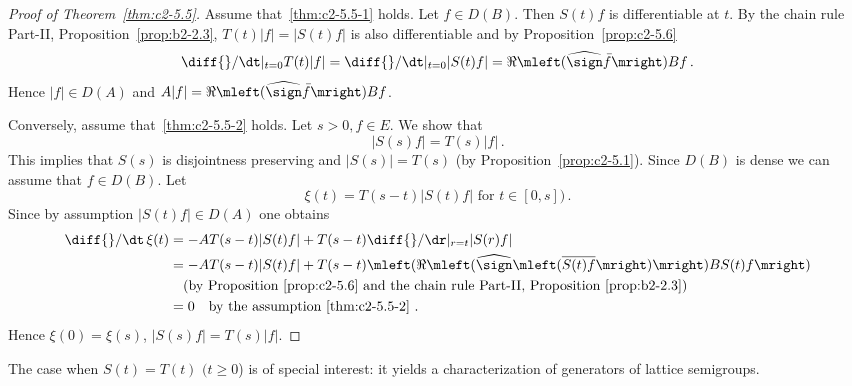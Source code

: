 \begin{proof}[Proof of Theorem~\ref{thm:c2-5.5}]
Assume that~\ref{thm:c2-5.5-1}   holds. 
Let $f \in D(B)$. 
Then $S(t)f$ is differentiable at $t$. 
By the chain rule Part-II, Proposition~\ref{prop:b2-2.3},
$T(t)|f| = |S(t)f|$ is also differentiable and by  Proposition~\ref{prop:c2-5.6}
\[
\diff{}/\dt|_{t=0} T(t)|f| = \diff{}/\dt|_{t=0} |S(t)f| = \Re\mleft(\widehat{\sign}  \bar{f}\mright)Bf\,.
\]
Hence $|f| \in D(A)$ and $A|f| = \Re\mleft(\widehat{\sign}  \bar{f}\mright)Bf$.

Conversely, assume that~\ref{thm:c2-5.5-2}   holds. 
Let $s > 0, f \in E$. 
We show that 
\[
|S(s)f| = T(s)|f|\,.
\]
This implies that $S(s)$ is disjointness preserving and $|S(s)| = T(s)$ (by Proposition~\ref{prop:c2-5.1}). 
Since $D(B)$ is dense we can assume that $f \in D(B)$. 
Let 
\[
\xi(t) = T(s-t)|S(t)f|  \text{ for } t \in [0,s])\,.
\]
Since by assumption $|S(t)f| \in D(A)$ one obtains
\begin{align*}
\diff{}/\dt \, \xi(t) &= -AT(s-t)|S(t)f| + T(s-t)\diff{}/\dr|_{r=t} |S(r)f|\\
&= -AT(s-t)|S(t)f| + T(s-t)\mleft(\Re\mleft(\widehat{\sign}  \mleft(\overline{S(t)f}\mright)\mright)BS(t)f\mright)\\
&\quad \text{(by  Proposition~\ref{prop:c2-5.6}   and the chain rule Part-II, Proposition~\ref{prop:b2-2.3})
}\\
&= 0 \quad \text{by the assumption~\ref{thm:c2-5.5-2}  }.
\end{align*}
Hence $\xi(0) = \xi(s)$, \ie $|S(s)f| = T(s)|f|$.
\end{proof}
The case when $S(t) = T(t)$ $(t \geq 0$) is of special interest: it yields a characterization of generators of lattice semigroups.

